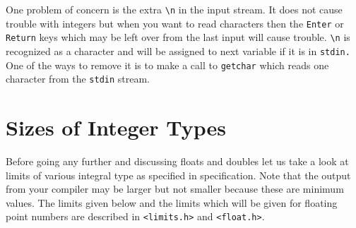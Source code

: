One problem of concern is the extra \texttt{\textbackslash n} in the input
stream. It does not cause trouble with integers but when you want to read
characters then the \texttt{Enter} or \texttt{Return} keys which may be left
over from the last input will cause trouble. \texttt{\textbackslash n} is
recognized as a character and will be assigned to next variable if it is in
\texttt{stdin.} One of the ways to remove it is to make a call to
\texttt{getchar} which reads one character from the \texttt{stdin} stream.

\section{Sizes of Integer Types}
Before going any further and discussing floats and doubles let us take a look
at limits of various integral type as specified in specification. Note that the
output from your compiler may be larger but not smaller because these are
minimum values. The limits given below and the limits which will be given for
floating point numbers are described in \texttt{<limits.h>} and
\texttt{<float.h>}.

